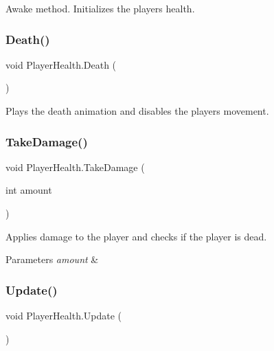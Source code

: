 Awake method. Initializes the player\textquotesingle{}s health. 

\mbox{\label{class_player_health_a0a4b5c4a0184cbe9b8a5af76764cf343}} 
\subsubsection{\texorpdfstring{Death()}{Death()}}
{\footnotesize\ttfamily void Player\+Health.\+Death (\begin{DoxyParamCaption}{ }\end{DoxyParamCaption})\hspace{0.3cm}{\ttfamily [private]}}



Plays the death animation and disables the player\textquotesingle{}s movement. 

\mbox{\label{class_player_health_a93c7a5b0a1baade297356b1f3341daf5}} 
\subsubsection{\texorpdfstring{Take\+Damage()}{TakeDamage()}}
{\footnotesize\ttfamily void Player\+Health.\+Take\+Damage (\begin{DoxyParamCaption}\item[{int}]{amount }\end{DoxyParamCaption})}



Applies damage to the player and checks if the player is dead. 


\begin{DoxyParams}{Parameters}
{\em amount} & \\
\hline
\end{DoxyParams}
\mbox{\label{class_player_health_a3c49fdd702b2cf0fca654ef6e502f311}} 
\subsubsection{\texorpdfstring{Update()}{Update()}}
{\footnotesize\ttfamily void Player\+Health.\+Update (\begin{DoxyParamCaption}{ }\end{DoxyParamCaption})\hspace{0.3cm}{\ttfamily [private]}}



